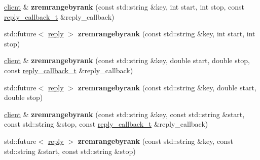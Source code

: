 \begin{DoxyCompactItemize}
\mbox{\label{classcpp__redis_1_1client_af40c1e6895312c13636db9dd610ce753}} 
\hyperlink{classcpp__redis_1_1client}{client} \& {\bfseries zremrangebyrank} (const std\+::string \&key, int start, int stop, const \hyperlink{classcpp__redis_1_1client_a061a1140d36d2eaeda82b09a0bb3f9f2}{reply\+\_\+callback\+\_\+t} \&reply\+\_\+callback)
\item 
\mbox{\label{classcpp__redis_1_1client_acc4f3b77c38c948658505ce04bbbde6d}} 
std\+::future$<$ \hyperlink{classcpp__redis_1_1reply}{reply} $>$ {\bfseries zremrangebyrank} (const std\+::string \&key, int start, int stop)
\item 
\mbox{\label{classcpp__redis_1_1client_a727a7eeae900fc82525544618deaa70b}} 
\hyperlink{classcpp__redis_1_1client}{client} \& {\bfseries zremrangebyrank} (const std\+::string \&key, double start, double stop, const \hyperlink{classcpp__redis_1_1client_a061a1140d36d2eaeda82b09a0bb3f9f2}{reply\+\_\+callback\+\_\+t} \&reply\+\_\+callback)
\item 
\mbox{\label{classcpp__redis_1_1client_a7ad8503cfe002efb2caa36a09791125f}} 
std\+::future$<$ \hyperlink{classcpp__redis_1_1reply}{reply} $>$ {\bfseries zremrangebyrank} (const std\+::string \&key, double start, double stop)
\item 
\mbox{\label{classcpp__redis_1_1client_aafca4e3ca703fff85b1b6a1c9476c958}} 
\hyperlink{classcpp__redis_1_1client}{client} \& {\bfseries zremrangebyrank} (const std\+::string \&key, const std\+::string \&start, const std\+::string \&stop, const \hyperlink{classcpp__redis_1_1client_a061a1140d36d2eaeda82b09a0bb3f9f2}{reply\+\_\+callback\+\_\+t} \&reply\+\_\+callback)
\item 
\mbox{\label{classcpp__redis_1_1client_a2215c127cf351c43b69f62d871e7acb7}} 
std\+::future$<$ \hyperlink{classcpp__redis_1_1reply}{reply} $>$ {\bfseries zremrangebyrank} (const std\+::string \&key, const std\+::string \&start, const std\+::string \&stop)
\item 
\mbox{\label{classcpp__redis_1_1client_a8de95c0d340cc58d81fe5ca9b576d5b8}} 

\end{DoxyCompactItemize}
